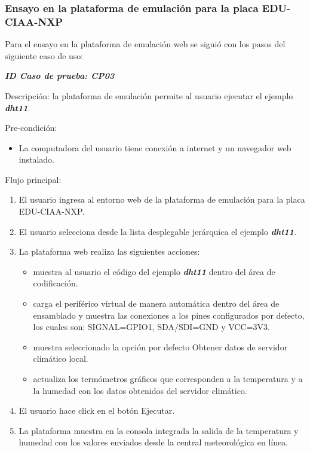 \subsubsection{Ensayo en la plataforma de emulación para la placa EDU-CIAA-NXP} 
Para el ensayo en la plataforma de emulación web se siguió con los pasos del siguiente caso de uso:

\textit{\textbf{ID Caso de prueba: CP03}}

Descripción: la plataforma de emulación permite al usuario ejecutar el ejemplo \textit{\textbf{dht11}}.

Pre-condición: 
\begin{itemize}
	\item La computadora del usuario tiene conexión a internet y un navegador web instalado.
\end{itemize}

Flujo principal:
\begin{enumerate}
	\item El usuario ingresa al entorno web de la plataforma de emulación para la placa EDU-CIAA-NXP.
	\item El usuario selecciona desde la lista desplegable jerárquica el ejemplo \textit{\textbf{dht11}}.
	\item La plataforma web realiza las siguientes acciones:
	 
	\begin{itemize}
	    \item muestra al usuario el código  del ejemplo \textit{\textbf{dht11}} dentro del área de codificación.
	    \item carga el periférico virtual de manera automática dentro del área de ensamblado y muestra las conexiones a los pines configurados por defecto, los cuales son: \textquotedbl SIGNAL=GPIO1\textquotedbl, \textquotedbl SDA/SDI=GND\textquotedbl{} y \textquotedbl VCC=3V3\textquotedbl.
	    \item muestra seleccionado la opción por defecto \textquotedbl Obtener datos de servidor climático local.\textquotedbl
	    \item actualiza los termómetros gráficos que corresponden a la temperatura y a la humedad con los datos obtenidos del servidor climático.
	\end{itemize}

	\item El usuario hace click en el botón \textquotedbl Ejecutar\textquotedbl.
	\item La plataforma muestra en la consola integrada la salida de la temperatura y humedad con los valores enviados desde la central meteorológica en línea.
\end{enumerate}


